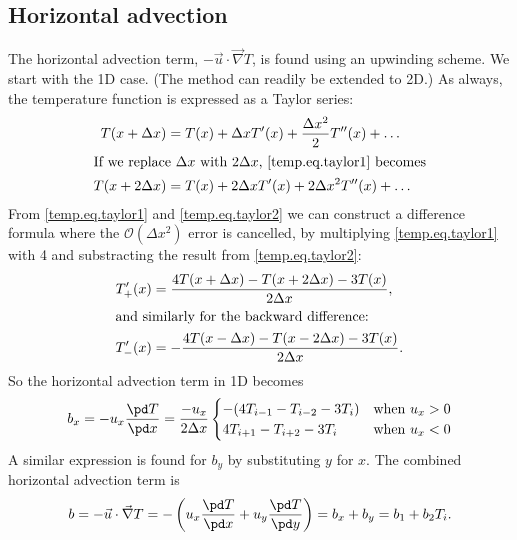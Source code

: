 \subsection{Horizontal advection}
The horizontal advection term, $- \vec{u}\cdot\vec\nabla T$, is found using an upwinding scheme. We start with the 1D case. (The method can readily be extended to 2D.) As always, the temperature function is expressed as a Taylor series:
\begin{subequations}
  \begin{align}
    \label{temp.eq.taylor1}
    T(x+\Delta x) &=T(x)+\Delta xT'(x)+\frac{\Delta x^2}2T''(x)+\ldots\\
    \intertext{If we replace $\Delta x$ with $2\Delta x$, \eqref{temp.eq.taylor1} becomes}
    \label{temp.eq.taylor2}
    T(x+2\Delta x) &=T(x)+2\Delta xT'(x)+2\Delta x^2T''(x)+\ldots
  \end{align}
\end{subequations}
From \eqref{temp.eq.taylor1} and \eqref{temp.eq.taylor2} we can construct a difference formula where the $\mathcal{O}(\Delta x^2)$ error is cancelled, by multiplying \eqref{temp.eq.taylor1} with 4 and substracting the result from \eqref{temp.eq.taylor2}:
\begin{subequations}
  \begin{align}
    \label{temp.eq.forward_h3}
    T_+'(x)&=\frac{4T(x+\Delta x)-T(x+2\Delta x)-3T(x)}{2\Delta x},\\
    \intertext{and similarly for the backward difference:}
    T_-'(x)&=-\frac{4T(x-\Delta x)-T(x-2\Delta x)-3T(x)}{2\Delta x}.
    \end{align}
\end{subequations}
So the horizontal advection term in 1D becomes
\begin{equation}
  b_x = -u_x\frac{\pd T}{\pd x}=\frac{-u_x}{2\Delta x}
  \begin{cases}
    -(4T_{i-1}-T_{i-2}-3T_i) & \text{when $u_x>0$} \\
    4T_{i+1}-T_{i+2}-3T_i & \text{when $u_x<0$} \\
  \end{cases}
\end{equation}
A similar expression is found for $b_y$ by substituting $y$ for $x$. The combined horizontal advection term is
\begin{equation}
  b=-\vec{u}\cdot\vec\nabla T=-\left(u_x\frac{\pd T}{\pd x}+u_y\frac{\pd T}{\pd y}\right)=b_x+b_y=b_1+b_2T_i.
\end{equation}

